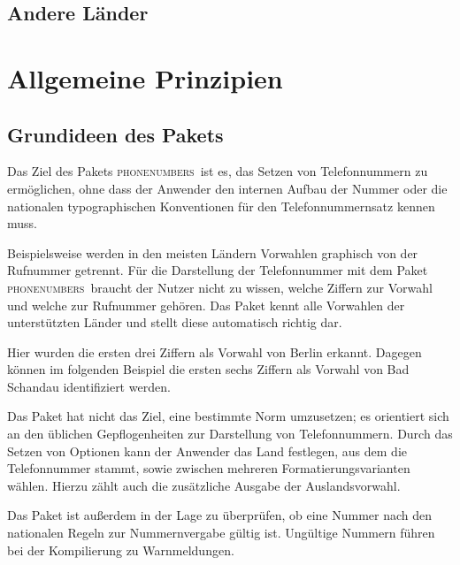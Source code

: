\documentclass[numbers=noenddot]{scrreprt}
\newcommand*{\Paket}[1]{\textsc{#1}}
\newcommand{\phone}{\textcolor{cnltx}{\Paket{phone\-numbers}}}
\begin{document}
\section{Andere Länder}
\begin{sidebyside}
\end{sidebyside}

\begin{sidebyside}
\end{sidebyside}

\chapter{Allgemeine Prinzipien}
\section{Grundideen des Pakets}
Das Ziel des Pakets \phone\ ist es, das Setzen von Telefonnummern zu ermöglichen, ohne dass der Anwender den internen Aufbau der Nummer oder die nationalen typographischen Konventionen für den Telefonnummernsatz kennen muss.

Beispielsweise werden in den meisten Ländern Vorwahlen graphisch von der Rufnummer getrennt. Für die Darstellung der Telefonnummer mit dem Paket \phone\ braucht der Nutzer nicht zu wissen, welche Ziffern zur Vorwahl und welche zur Rufnummer gehören. Das Paket kennt alle Vorwahlen der unterstützten Länder und stellt diese automatisch richtig dar.
\begin{sidebyside}
\end{sidebyside}
Hier wurden die ersten drei Ziffern als Vorwahl von Berlin erkannt. Dagegen können im folgenden Beispiel die ersten sechs Ziffern als Vorwahl von Bad Schandau identifiziert werden.
\begin{sidebyside}
\end{sidebyside}

Das Paket hat nicht das Ziel, eine bestimmte Norm umzusetzen; es orientiert sich an den üblichen Gepflogenheiten zur Darstellung von Telefonnummern. Durch das Setzen von Optionen kann der Anwender das Land festlegen, aus dem die Telefonnummer stammt, sowie zwischen mehreren Formatierungsvarianten wählen. Hierzu zählt auch die zusätzliche Ausgabe der Auslandsvorwahl.

Das Paket ist außerdem in der Lage zu überprüfen, ob eine Nummer nach den nationalen Regeln zur Nummernvergabe gültig ist. Ungültige Nummern führen bei der Kompilierung zu Warnmeldungen.
\end{document}
